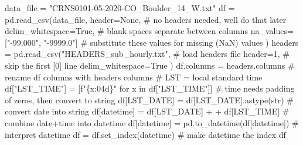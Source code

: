 \documentclass[
  letterpaper,
  DIV=11,
  numbers=noendperiod]{scrreprt}
\newenvironment{Shaded}{\begin{snugshade}}{\end{snugshade}}
\newcommand{\BuiltInTok}[1]{\textcolor[rgb]{0.00,0.23,0.31}{#1}}
\newcommand{\CommentTok}[1]{\textcolor[rgb]{0.37,0.37,0.37}{#1}}
\newcommand{\ControlFlowTok}[1]{\textcolor[rgb]{0.00,0.23,0.31}{#1}}
\newcommand{\DecValTok}[1]{\textcolor[rgb]{0.68,0.00,0.00}{#1}}
\newcommand{\KeywordTok}[1]{\textcolor[rgb]{0.00,0.23,0.31}{#1}}
\newcommand{\NormalTok}[1]{\textcolor[rgb]{0.00,0.23,0.31}{#1}}
\newcommand{\OperatorTok}[1]{\textcolor[rgb]{0.37,0.37,0.37}{#1}}
\newcommand{\SpecialCharTok}[1]{\textcolor[rgb]{0.37,0.37,0.37}{#1}}
\newcommand{\SpecialStringTok}[1]{\textcolor[rgb]{0.13,0.47,0.30}{#1}}
\newcommand{\StringTok}[1]{\textcolor[rgb]{0.13,0.47,0.30}{#1}}
\newcommand{\VariableTok}[1]{\textcolor[rgb]{0.07,0.07,0.07}{#1}}
\begin{document}
\begin{Shaded}
\begin{Highlighting}[]
\NormalTok{data\_file }\OperatorTok{=} \StringTok{"CRNS0101{-}05{-}2020{-}CO\_Boulder\_14\_W.txt"}
\NormalTok{df }\OperatorTok{=}\NormalTok{ pd.read\_csv(data\_file,}
\NormalTok{                 header}\OperatorTok{=}\VariableTok{None}\NormalTok{,                      }\CommentTok{\# no headers needed, we\textquotesingle{}ll do that later}
\NormalTok{                 delim\_whitespace}\OperatorTok{=}\VariableTok{True}\NormalTok{,            }\CommentTok{\# blank spaces separate between columns}
\NormalTok{                 na\_values}\OperatorTok{=}\NormalTok{[}\StringTok{"{-}99.000"}\NormalTok{, }\StringTok{"{-}9999.0"}\NormalTok{]  }\CommentTok{\# substitute these values for missing (NaN) values}
\NormalTok{                )}
\NormalTok{headers }\OperatorTok{=}\NormalTok{ pd.read\_csv(}\StringTok{"HEADERS\_sub\_hourly.txt"}\NormalTok{,    }\CommentTok{\# load headers file}
\NormalTok{                      header}\OperatorTok{=}\DecValTok{1}\NormalTok{,                    }\CommentTok{\# skip the first [0] line}
\NormalTok{                      delim\_whitespace}\OperatorTok{=}\VariableTok{True}
\NormalTok{                     )}
\NormalTok{df.columns }\OperatorTok{=}\NormalTok{ headers.columns                       }\CommentTok{\# rename df columns with headers columns}
\CommentTok{\# LST = local standard time}
\NormalTok{df[}\StringTok{"LST\_TIME"}\NormalTok{] }\OperatorTok{=}\NormalTok{ [}\SpecialStringTok{f"}\SpecialCharTok{\{}\NormalTok{x}\SpecialCharTok{:04d\}}\SpecialStringTok{"} \ControlFlowTok{for}\NormalTok{ x }\KeywordTok{in}\NormalTok{ df[}\StringTok{"LST\_TIME"}\NormalTok{]]  }\CommentTok{\# time needs padding of zeros, then convert to string}
\NormalTok{df[}\StringTok{\textquotesingle{}LST\_DATE\textquotesingle{}}\NormalTok{] }\OperatorTok{=}\NormalTok{ df[}\StringTok{\textquotesingle{}LST\_DATE\textquotesingle{}}\NormalTok{].astype(}\BuiltInTok{str}\NormalTok{)            }\CommentTok{\# convert date into string}
\NormalTok{df[}\StringTok{\textquotesingle{}datetime\textquotesingle{}}\NormalTok{] }\OperatorTok{=}\NormalTok{ df[}\StringTok{\textquotesingle{}LST\_DATE\textquotesingle{}}\NormalTok{] }\OperatorTok{+} \StringTok{\textquotesingle{} \textquotesingle{}} \OperatorTok{+}\NormalTok{ df[}\StringTok{\textquotesingle{}LST\_TIME\textquotesingle{}}\NormalTok{] }\CommentTok{\# combine date+time into datetime}
\NormalTok{df[}\StringTok{\textquotesingle{}datetime\textquotesingle{}}\NormalTok{] }\OperatorTok{=}\NormalTok{ pd.to\_datetime(df[}\StringTok{\textquotesingle{}datetime\textquotesingle{}}\NormalTok{])        }\CommentTok{\# interpret datetime}
\NormalTok{df }\OperatorTok{=}\NormalTok{ df.set\_index(}\StringTok{\textquotesingle{}datetime\textquotesingle{}}\NormalTok{)                          }\CommentTok{\# make datetime the index}
\NormalTok{df}
\end{Highlighting}
\end{Shaded}
\end{document}
